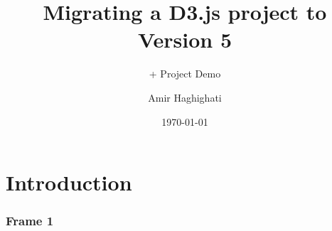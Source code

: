 \documentclass[11pt]{beamer}
\begin{document}
	\author{Amir Haghighati}
	\title{Migrating a D3.js project to Version 5}
	\subtitle{+ Project Demo}
	\date{\today}
	\subject{Lab Presentations}
	\begin{frame}
	\maketitle
\end{frame}

\section{Introduction}
\begin{frame}
\frametitle{Frame 1}
\end{frame}
\end{document}
